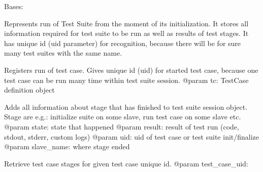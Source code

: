 \documentclass[a4paper,11pt,openany]{sphinxmanual}
\begin{document}
\begin{fulllineitems}
\label{ref-manual/XrdTest:XrdTest.TestUtils.TestSuiteSession}
Bases: {\hyperref[ref-manual/XrdTest:XrdTest.Utils.Stateful]{}}

Represents run of Test Suite from the moment of its initialization.
It stores all information required for test suite to be run as well as
results of test stages. It has unique id (uid parameter) for recognition,
because there will be for sure many test suites with the same name.

\begin{fulllineitems}
\label{ref-manual/XrdTest:XrdTest.TestUtils.TestSuiteSession.addCaseRun}
Registers run of test case. Gives unique id (uid) for started
test case, because one test case can be run many time within test
suite session.
@param tc: TestCase definition object

\end{fulllineitems}


\begin{fulllineitems}
\label{ref-manual/XrdTest:XrdTest.TestUtils.TestSuiteSession.addStageResult}
Adds all information about stage that has finished to test suite session
object. Stage are e.g.: initialize suite on some slave, run test case
on some slave etc.
@param state: state that happened
@param result: result of test run (code, stdout, stderr, custom logs)
@param uid: uid of test case or test suite init/finalize
@param slave\_name: where stage ended

\end{fulllineitems}


\begin{fulllineitems}
\label{ref-manual/XrdTest:XrdTest.TestUtils.TestSuiteSession.getTestCaseStages}
Retrieve test case stages for given test case unique id.
@param test\_case\_uid:

\end{fulllineitems}


\begin{fulllineitems}
\label{ref-manual/XrdTest:XrdTest.TestUtils.TestSuiteSession.sendEmailAlert}
\end{fulllineitems}


\end{fulllineitems}
\end{document}
